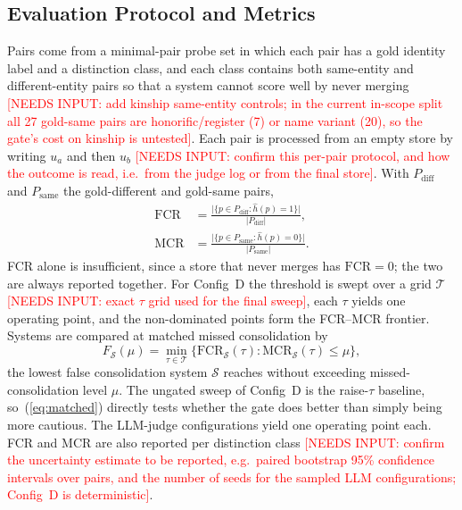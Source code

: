 \documentclass[conference]{IEEEtran}
\newcommand{\pending}[1]{\textcolor{red}{#1}}
\begin{document}
\subsection{Evaluation Protocol and Metrics}

Pairs come from a minimal-pair probe set in which each pair has a gold
identity label and a distinction class, and each class contains both
same-entity and different-entity pairs so that a system cannot score well
by never merging
\pending{[NEEDS INPUT: add kinship same-entity controls; in the current
in-scope split all 27 gold-same pairs are honorific/register (7) or name
variant (20), so the gate's cost on kinship is untested]}.
Each pair is processed from an empty store by writing $u_a$ and then $u_b$
\pending{[NEEDS INPUT: confirm this per-pair protocol, and how the outcome
is read, i.e.\ from the judge log or from the final store]}. With
$P_{\mathrm{diff}}$ and $P_{\mathrm{same}}$ the gold-different and
gold-same pairs,
\begin{align}
\mathrm{FCR} &= \frac{\big|\{p \in P_{\mathrm{diff}} : \hat{h}(p) = 1\}\big|}{|P_{\mathrm{diff}}|},
\label{eq:fcr}\\
\mathrm{MCR} &= \frac{\big|\{p \in P_{\mathrm{same}} : \hat{h}(p) = 0\}\big|}{|P_{\mathrm{same}}|}.
\label{eq:mcr}
\end{align}
FCR alone is insufficient, since a store that never merges has
$\mathrm{FCR}=0$; the two are always reported together. For Config~D the
threshold is swept over a grid $\mathcal{T}$
\pending{[NEEDS INPUT: exact $\tau$ grid used for the final sweep]}, each
$\tau$ yields one operating point, and the non-dominated points form the
FCR--MCR frontier. Systems are compared at matched missed consolidation by
\begin{equation}
F_{\mathcal{S}}(\mu) = \min_{\tau \in \mathcal{T}} \big\{\mathrm{FCR}_{\mathcal{S}}(\tau) : \mathrm{MCR}_{\mathcal{S}}(\tau) \le \mu \big\},
\label{eq:matched}
\end{equation}
the lowest false consolidation system $\mathcal{S}$ reaches without
exceeding missed-consolidation level $\mu$. The ungated sweep of Config~D
is the raise-$\tau$ baseline, so~(\ref{eq:matched}) directly tests whether
the gate does better than simply being more cautious. The LLM-judge
configurations yield one operating point each. FCR and MCR are also
reported per distinction class
\pending{[NEEDS INPUT: confirm the uncertainty estimate to be reported,
e.g.\ paired bootstrap 95\% confidence intervals over pairs, and the number
of seeds for the sampled LLM configurations; Config~D is deterministic]}.
\end{document}
